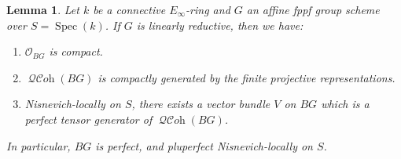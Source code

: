 \documentclass[12pt, oneside]{amsart}
\numberwithin{equation}{section}
\newtheorem{lemma}[subsubsection]{Lemma}
\theoremstyle{remark}
\theoremstyle{plain}
\DeclareMathOperator{\QCOH}{\mathcal{QC}\textit{oh}}
\newcommand{\OO}{\mathcal{O}}
\DeclareMathOperator{\spc}{Spec}
\begin{document}
\begin{lemma}\label{lem:BG pluperfect lin red}
  Let $k$ be a connective $E_\infty$-ring and $G$ an affine fppf group scheme over $S=\spc(k)$.
  If $G$ is linearly reductive, then we have:
  \begin{enumerate}
    \item
    $\OO_{BG}$ is compact.

    \item\label{item:BG pluperfect lin red/compgen}
    $\QCOH(BG)$ is compactly generated by the finite projective representations.

    \item\label{item:BG pluperfect lin red/generators}
    Nisnevich-locally on $S$, there exists a vector bundle $V$ on $BG$ which is a perfect tensor generator of $\QCOH(BG)$.
  \end{enumerate}
  In particular, $BG$ is perfect, and pluperfect Nisnevich-locally on $S$.
\end{lemma}
\end{document}
